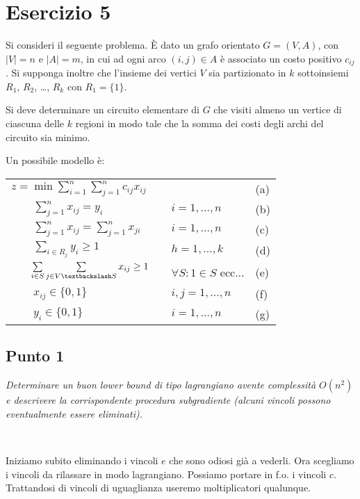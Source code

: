 \documentclass[11pt]{book}
\begin{document}
\chapter*{Esercizio 5}

Si consideri il seguente problema. \`E dato un grafo orientato
$G=(V,A)$, con $|V|=n$ e $|A|=m$, in cui ad ogni arco $(i,j)\in A$ \`e
associato un costo positivo $c_{ij}$. Si supponga inoltre che
l'insieme dei vertici $V$ sia partizionato in $k$ sottoinsiemi $R_1$,
$R_2$, \dots, $R_k$ con $R_1 = \{ 1 \}$.

Si deve determinare un circuito elementare di $G$ che visiti almeno un
vertice di ciascuna delle $k$ regioni in modo tale che la somma dei
costi degli archi del circuito sia minimo.


Un possibile modello \`e:

\begin{center}
\begin{tabular}{lp{2cm}ll}
  $z = \min \sum\limits_{i=1}^n\sum\limits_{j=1}^n c_{ij} x_{ij}$ & & & (a)\\
  $\qquad \sum\limits_{j=1}^n x_{ij} = y_i$ & & $i=1,\dots,n$ & (b)\\
  $\qquad \sum\limits_{j=1}^n x_{ij} = \sum\limits_{j=1}^n x_{ji} $ & & $i=1,\dots,n$ & (c)\\
  $\qquad \sum\limits_{i \in R_j} y_i \geq 1$ & & $h = 1,\dots,k$ &
  (d) \\
  $\qquad \sum\limits_{i\in S}\sum\limits_{j\in V \textbackslash S}
  x_{ij} \geq 1$ & & $\forall S :1\in S$ ecc... & (e) \\
  $\qquad x_{ij} \in\{0,1\}$ & & $i,j = 1,\dots,n$ & (f) \\
  $\qquad y_{i} \in\{0,1\}$ & & $i = 1,\dots,n$ & (g) \\
\end{tabular}
\end{center}

\section*{Punto 1}

\textit{Determinare un buon lower bound di tipo lagrangiano avente
  complessit\`a $O(n^2)$ e descrivere la corrispondente procedura
  subgradiente (alcuni vincoli possono eventualmente essere
  eliminati).}

\

Iniziamo subito eliminando i vincoli $e$ che sono odiosi gi\`a a
vederli. Ora scegliamo i vincoli da rilassare in modo
lagrangiano. Possiamo portare in f.o. i vincoli $c$. Trattandosi di
vincoli di uguaglianza useremo moltiplicatori qualunque.
\end{document}
